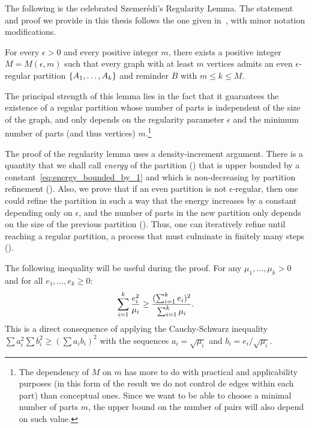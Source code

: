         The following is the celebrated Szemerédi's Regularity Lemma.
        The statement and proof we provide in this thesis follows the one given in~\cite{extremal_graph_theory},
        with minor notation modifications.

        \begin{theorem} \label{thm:szemeredi_regularity_lemma}
            For every $\epsilon > 0$ and every positive integer $m$, there exists a positive integer $M = M(\epsilon, m)$
            such that every graph with at least $m$ vertices admits an even $\epsilon$-regular partition
            $\{ A_1, \ldots, A_k \}$ and reminder $B$ with $m \leq k \leq M$.
        \end{theorem}

        The principal strength of this lemma lies in the fact that it guarantees the existence of a regular partition
        whose number of parts is independent of the size of the graph, and only depends on the regularity parameter
        $\epsilon$ and the minimum number of parts (and thus vertices) $m$.\footnote{
            The dependency of $M$ on $m$ has more to do with practical and applicability purposes (in this form of the
            result we do not control de edges within each part) than conceptual ones.
            Since we want to be able to choose a minimal number of parts $m$, the upper bound on the number of pairs will
            also depend on such value.}

        The proof of the regularity lemma uses a density-increment argument.
        There is a quantity that we shall call \emph{energy} of the partition () that is upper bounded by
        a constant~\eqref{eq:energy_bounded_by_1} and which is non-decreasing by partition refinement
        ().
        Also, we prove that if an even partition is not $\epsilon$-regular, then one could refine the partition in
        such a way that the energy increases by a constant depending only on $\epsilon$, and the number of parts in the
        new partition only depends on the size of the previous partition
        ().
        Thus, one can iteratively refine until reaching a regular partition, a process that must culminate in finitely
        many steps ().

        The following inequality will be useful during the proof.
        For any $\mu_1, \dots, \mu_k > 0$ and for all $e_1, \dots, e_k \geq 0$:
        \begin{equation} \label{eq:cauchy_schwarz_inequality_plus}
            \sum_{i=1}^k \frac{e_i^2}{\mu_i}
                \geq \frac{( \sum_{i=1}^k e_i )^2}{\sum_{i=1}^k \mu_i}.
        \end{equation}
        This is a direct consequence of applying the Cauchy-Schwarz inequality $\sum a_i^2 \sum b_i^2 \geq (\sum a_i b_i)^2$
        with the sequences $a_i = \sqrt{\mu_i}$ and $b_i = e_i / \sqrt{\mu_i}$.

